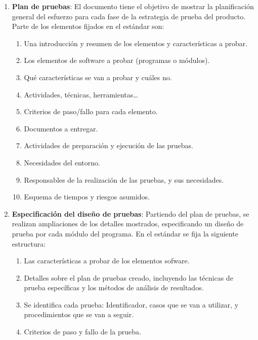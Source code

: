 \begin{enumerate}
    \item \textbf{Plan de pruebas}: El documento tiene el objetivo de mostrar la planificación general del esfuerzo para cada fase de la estrategia de prueba del producto. Parte de los elementos fijados en el estándar son:
    \begin{enumerate}
        \item Una introducción y resumen de los elementos y características a probar.
        \item Los elementos de software a probar (programas o módulos).
        \item Qué características se van a probar y cuáles no.
        \item Actividades, técnicas, herramientas\ldots
        \item Criterios de paso/fallo para cada elemento.
        \item Documentos a entregar.
        \item Actividades de preparación y ejecución de las pruebas.
        \item Necesidades del entorno.
        \item Responsables de la realización de las pruebas, y sus necesidades.
        \item Esquema de tiempos y riesgos asumidos.
    \end{enumerate}

    \item \textbf{Especificación del diseño de pruebas}: Partiendo del plan de pruebas, se realizan ampliaciones de los detalles mostrados, especificando un diseño de prueba por cada módulo del programa. En el estándar se fija la siguiente estructura:
    \begin{enumerate}
        \item Las características a probar de los elementos sofware.
        \item Detalles sobre el plan de pruebas creado, incluyendo las técnicas de prueba específicas y los métodos de análisis de resultados.
        \item Se identifica cada prueba: Identificador, casos que se van a utilizar, y procedimientos que se van a seguir.
        \item Criterios de paso y fallo de la prueba.
    \end{enumerate}


\end{enumerate}

